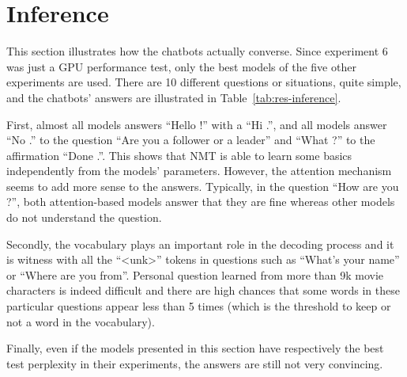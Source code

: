 \section{Inference}
\label{sec:inference}
This section illustrates how the chatbots actually converse. Since experiment 6 was just a GPU performance test, only the best models of the five other experiments are used. There are 10 different questions or situations, quite simple, and the chatbots' answers are illustrated in Table~\ref{tab:res-inference}.

First, almost all models answers ``Hello !'' with a ``Hi .'', and all models answer ``No .'' to the question ``Are you a follower or a leader'' and ``What ?'' to the affirmation ``Done .''. This shows that NMT is able to learn some basics independently from the models' parameters.
However, the attention mechanism seems to add more sense to the answers. Typically, in the question ``How are you ?'', both attention-based models answer that they are fine whereas other models do not understand the question.

Secondly, the vocabulary plays an important role in the decoding process and it is witness with all the ``<unk>'' tokens in questions such as ``What's your name'' or ``Where are you from''. Personal question learned from more than 9k movie characters is indeed difficult and there are high chances that some words in these particular questions appear less than 5 times (which is the threshold to keep or not a word in the vocabulary).

Finally, even if the models presented in this section have respectively the best test perplexity in their experiments, the answers are still not very convincing.

